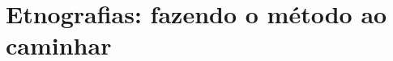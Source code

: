 %
%
%
%
%
%

\section{Etnografias: fazendo o método ao caminhar}
\label{sec:etnografia-heterodoxa}

